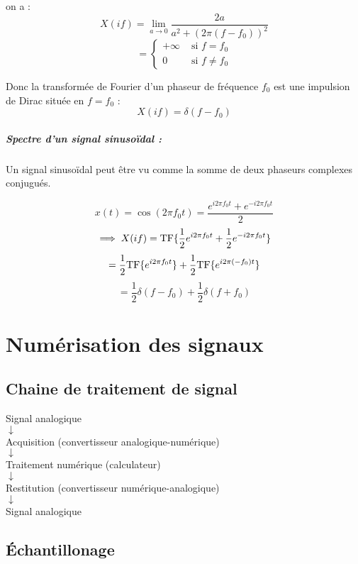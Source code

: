 \documentclass[a4paper,12pt]{report}
\begin{document}
on a :
\[ X(if) = \lim_{a \to 0} \dfrac{2a}{a^2 + (2\pi(f-f_0))^2} \]
\[ = \begin{cases}
    +\infty & \text{ si } f = f_0 \\
    0 & \text{ si } f \neq f_0
\end{cases} \]

Donc la transformée de Fourier d'un phaseur de fréquence $f_0$ est une impulsion de Dirac située en $f=f_0$ :
\[ X(if) = \delta(f-f_0) \]

\paragraph{Spectre d'un signal sinusoïdal :}

Un signal sinusoïdal peut être vu comme la somme de deux phaseurs complexes conjugués.

\[ x(t) = \cos(2\pi f_0 t) = \dfrac{e^{i2\pi f_0t} + e^{-i2\pi f_0t}}{2} \]
\[ \implies X(if) = \mathrm{TF} \{  \dfrac{1}{2} e^{i2\pi f_0t} + \dfrac{1}{2} e^{-i2\pi f_0t} \} \]
\[ = \dfrac{1}{2} \mathrm{TF} \{ e^{i2\pi f_0t} \} + \dfrac{1}{2} \mathrm{TF} \{ e^{i2\pi (-f_0)t} \} \]
\[ = \dfrac{1}{2} \delta(f-f_0) + \dfrac{1}{2} \delta(f+f_0) \]

\chapter{Numérisation des signaux}

\section{Chaine de traitement de signal}

\begin{center}
    Signal analogique \\
    $\downarrow$ \\
    Acquisition (convertisseur analogique-numérique) \\
    $\downarrow$ \\
    Traitement numérique (calculateur) \\
    $\downarrow$ \\
    Restitution (convertisseur numérique-analogique) \\
    $\downarrow$ \\
    Signal analogique
\end{center}

\section{Échantillonage}
\end{document}
